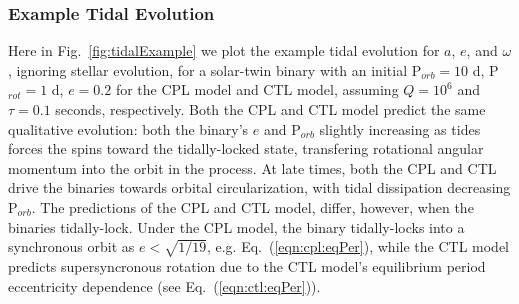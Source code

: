 \documentclass[twocolumn]{aastex61}
\begin{document}
\subsubsection{Example Tidal Evolution} \label{sec:methods:eqtideExample}

Here in Fig.~\ref{fig:tidalExample} we plot the example tidal evolution for $a$, $e$, and $\omega$, ignoring stellar evolution, for a solar-twin binary with an initial P$_{orb} = 10$ d, P$_{rot} = 1$ d, $e = 0.2$ for the CPL model and CTL model, assuming $Q=10^6$ and $\tau = 0.1$ seconds, respectively. Both the CPL and CTL model predict the same qualitative evolution: both the binary's $e$ and P$_{orb}$ slightly increasing as tides forces the spins toward the tidally-locked state, transfering rotational angular momentum into the orbit in the process.  At late times, both the CPL and CTL drive the binaries towards orbital circularization, with tidal dissipation decreasing P$_{orb}$. The predictions of the CPL and CTL model, differ, however, when the binaries tidally-lock.  Under the CPL model, the binary tidally-locks into a synchronous orbit as $e < \sqrt{1/19}$, e.g. Eq.~(\ref{eqn:cpl:eqPer}), while the CTL model predicts supersyncronous rotation due to the CTL model's equilibrium period eccentricity dependence (see Eq.~(\ref{eqn:ctl:eqPer})).
\end{document}
